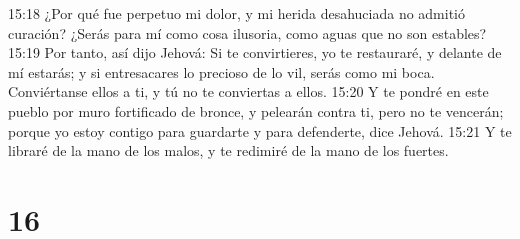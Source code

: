 15:18 ¿Por qué fue perpetuo mi dolor, y mi herida desahuciada no admitió curación? ¿Serás para mí como cosa ilusoria, como aguas que no son estables?  
15:19 Por tanto, así dijo Jehová: Si te convirtieres, yo te restauraré, y delante de mí estarás; y si entresacares lo precioso de lo vil, serás como mi boca. Conviértanse ellos a ti, y tú no te conviertas a ellos.  
15:20 Y te pondré en este pueblo por muro fortificado de bronce, y pelearán contra ti, pero no te vencerán; porque yo estoy contigo para guardarte y para defenderte, dice Jehová.  
15:21 Y te libraré de la mano de los malos, y te redimiré de la mano de los fuertes.  

\chapter{16}

